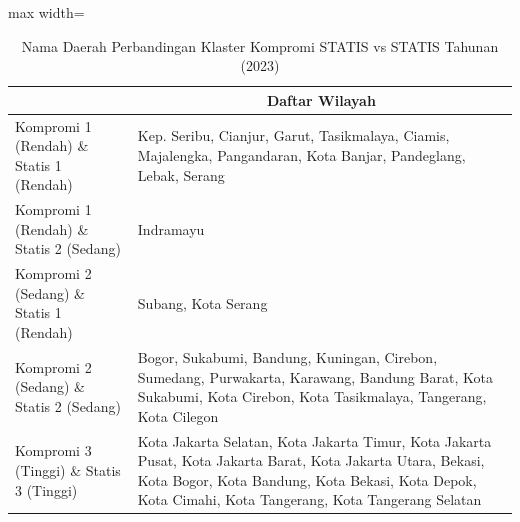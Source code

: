 \begin{table}[H]
\centering
\caption{Nama Daerah Perbandingan Klaster Kompromi STATIS vs STATIS Tahunan (2023)} \label{tab:app2comp_statis_name_2023}
\begin{adjustbox}{max width=\textwidth}
\begin{tabular}{|>{\centering\arraybackslash}p{4cm}|p{10cm}|}
\hline
\multicolumn{1}{|c|}{\textbf{Kategori}} & \multicolumn{1}{c|}{\textbf{Daftar Wilayah}} \\
\hline
Kompromi 1 (Rendah) \& Statis 1 (Rendah) & Kep. Seribu, Cianjur, Garut, Tasikmalaya, Ciamis, Majalengka, Pangandaran, Kota Banjar, Pandeglang, Lebak, Serang \\
\hline
Kompromi 1 (Rendah) \& Statis 2 (Sedang) & Indramayu \\
\hline
Kompromi 2 (Sedang) \& Statis 1 (Rendah) & Subang, Kota Serang \\
\hline
Kompromi 2 (Sedang) \& Statis 2 (Sedang) & Bogor, Sukabumi, Bandung, Kuningan, Cirebon, Sumedang, Purwakarta, Karawang, Bandung Barat, Kota Sukabumi, Kota Cirebon, Kota Tasikmalaya, Tangerang, Kota Cilegon \\
\hline
Kompromi 3 (Tinggi) \& Statis 3 (Tinggi) & Kota Jakarta Selatan, Kota Jakarta Timur, Kota Jakarta Pusat, Kota Jakarta Barat, Kota Jakarta Utara, Bekasi, Kota Bogor, Kota Bandung, Kota Bekasi, Kota Depok, Kota Cimahi, Kota Tangerang, Kota Tangerang Selatan \\
\hline
\end{tabular}
\end{adjustbox}
\end{table}